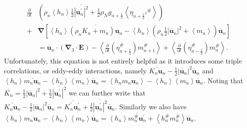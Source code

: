 \documentclass[12pt,a4paper]{report}
\newcommand*\thkmean[1]{\overline{#1}}
\newcommand*\thkres[1]{{#1}^{\prime}}
\newcommand*\nthkmean[1]{\left\langle{#1}\right\rangle}
\newcommand*\nthkres[1]{{#1}^{\#}}
\newcommand*{\half}{\frac{1}{2}}
\begin{document}
        \begin{equation}
        \begin{split}
            \frac{\partial}{\partial t}&\left(\rho_{n} \nthkmean{h_{n}} \half\thkmean{ \left|\thkres{\boldsymbol{u}}_{n}\right|^{2}}+ 
            \half \rho_{N} g_{n+\half }\nthkmean{\nthkres{\eta_{n+\half ^{2}}}} \right)
            \\
            +&\boldsymbol{\nabla} \left[\nthkmean{h_{n}} \thkmean{\left(\rho_{n}K_{n}+m_{n}\right) \boldsymbol{u}_{n}} 
            -\nthkmean{h_{n}} \left(\rho_{n}\half \left|\thkmean{\boldsymbol{u}}_{n}\right|^{2}+\nthkmean{m_{n}}\right) \thkmean{\boldsymbol{u}}_{n}\right]\\
            &=\thkmean{\boldsymbol{u}}_{n} \cdot \left(\boldsymbol{\nabla}_{3}\cdot \boldsymbol{E}\right)
            - \nthkmean{\frac{\partial}{\partial t}\left(\nthkres{\eta}_{n+\half }\right)   \nthkres{m}_{n+1}}
            + \nthkmean{\frac{\partial}{\partial t}\left(\nthkres{\eta}_{n-\half }\right) \nthkres{m}_{n}}.
          \end{split}
          \label{eddyenergy}
        \end{equation}
        Unfortunately, this equation is not entirely helpful as it
        introduces some triple correlations, or eddy-eddy interactions,
        namely $\thkmean{K_{n} \boldsymbol{u}_{n}}
        -\half \left|\thkmean{\boldsymbol{u}}_{n}\right|^{2}
        \thkmean{\boldsymbol{u}}_{n}$ and 
        $\nthkmean{h_{n}}\thkmean{m_{n}\boldsymbol{u}_{n}}
        -\nthkmean{h_{n}} \nthkmean{m_{n}}\thkmean{\boldsymbol{u}}_{n}
         = \nthkmean{h_{n}m_{n}\boldsymbol{u}_{n}}
        -\nthkmean{h_{n}}\nthkmean{m_{n}}\thkmean{\boldsymbol{u}}_{n}$.
        Noting that $\thkmean{K_{n}} = \half \left|\thkmean{\boldsymbol{u}}_{n}\right|^{2} +
        \half \thkmean{\left|\thkres{\boldsymbol{u}}_{n}\right|^{2}}$
        we can further write that 
        $\thkmean{K_{n} \boldsymbol{u}_{n}}
        -\half \left|\thkmean{\boldsymbol{u}}_{n}\right|^{2}
        \thkmean{\boldsymbol{u}}_{n} = \thkmean{\thkres{K}_{n} \thkres{\boldsymbol{u}}_{n}}
                +\half \thkmean{\left|\thkres{\boldsymbol{u}}_{n}\right|^{2}}
                \thkmean{\boldsymbol{u}}_{n}$. Similarly we
                also have 
                $\nthkmean{h_{n}}\thkmean{m_{n}\boldsymbol{u}_{n}}
                -\nthkmean{h_{n}} \nthkmean{m_{n}}\thkmean{\boldsymbol{u}}_{n}
                = 
                \nthkmean{h_{n}}\thkmean{\nthkres{m}_{n}\thkres{\boldsymbol{u}}_{n}}
                +\nthkmean{\nthkres{h}_{n} \nthkres{m}_{n}}\thkmean{\boldsymbol{u}}_{n}$.
\end{document}
